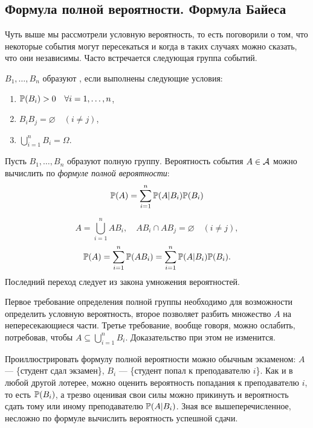 \documentclass[../TV&MS.tex]{subfiles}
\begin{document}
\subsection{Формула полной вероятности. Формула Байеса}

\qquad Чуть выше мы рассмотрели условную вероятность, то есть поговорили о том, что
некоторые события могут пересекаться и когда в таких случаях можно сказать, что они
независимы. Часто встречается следующая группа событий.	
	
\begin{Def}
$B_1, \ldots, B_n$ образуют , если выполнены следующие условия:
	\begin{enumerate}
		\item $\mathbb{P}(B_i) > 0 \quad \forall i = 1, \ldots, n$,
		\item $B_iB_j = \varnothing \quad (i \not= j)$,
		\item $\bigcup\limits_{i=1}^nB_i = \Omega$.
	\end{enumerate}
\end{Def}

\begin{Th}
Пусть $B_1, \ldots, B_n$ образуют полную группу. Вероятность события $A \in \mathcal{A}$ можно 
вычислить по \emph{формуле полной вероятности}:
$$\mathbb{P}(A) = \sum\limits_{i=1}^{n} \mathbb{P}(A|B_i)\mathbb{P}(B_i)$$
\end{Th}

\begin{Proof}
$$A=\bigcup\limits_{i=1}^{n}AB_i, \quad AB_i \cap AB_j = \varnothing \quad (i \not= j),$$
$$\mathbb{P}(A) = \sum\limits_{i=1}^n \mathbb{P}(AB_i) = \sum\limits_{i=1}^{n} \mathbb{P}(A|B_i)\mathbb{P}(B_i).$$
Последний переход следует из  закона умножения вероятностей.
\end{Proof}

Первое требование определения полной группы необходимо для возможности определить 
условную вероятность, второе позволяет разбить множество $A$ на непересекающиеся части. 
Третье требование, вообще говоря, можно ослабить, потребовав, чтобы 
$A \subseteq \bigcup\limits_{i=1}^nB_i$. Доказательство при этом не изменится. \\

\begin{Ex}
Проиллюстрировать формулу полной вероятности можно обычным экзаменом: $A$ --- \{студент сдал экзамен\}, 
$B_i$ --- \{студент попал к преподавателю $i$\}. Как и в любой другой лотерее, можно оценить вероятность 
попадания к преподавателю $i$, то есть $\mathbb{P}(B_i)$, а трезво оценивая свои силы можно прикинуть 
и вероятность сдать тому или иному преподавателю $\mathbb{P}(A|B_i)$. Зная все вышеперечисленное, 
несложно по формуле вычислить вероятность успешной сдачи.
\end{Ex}
\end{document}
